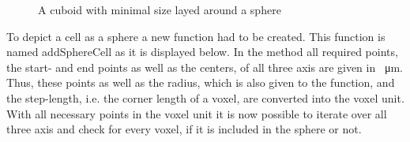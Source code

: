 \begin{figure}
\begin{center}
\caption{A cuboid with minimal size layed around a sphere}
\label{tikz:CuboidSphere}
\end{center}
\end{figure}

To depict a cell as a sphere a new function had to be created. This function is named addSphereCell as it is displayed below. In the method all required points, the start- and end points as well as the centers, of all three axis are given in \SI{}{\micro\metre}. Thus, these points as well as the radius, which is also given to the function, and the step-length, i.e. the corner length of a voxel, are converted into the voxel unit. \newline
With all necessary points in the voxel unit it is now possible to iterate over all three axis and check for every voxel, if it is included in the sphere or not.



